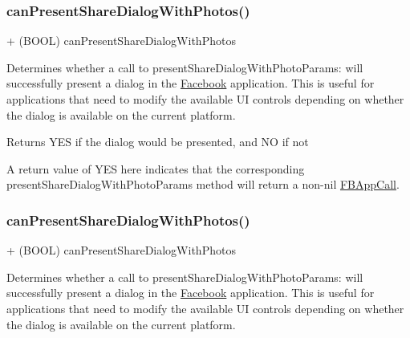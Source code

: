\subsubsection{\texorpdfstring{can\+Present\+Share\+Dialog\+With\+Photos()}{canPresentShareDialogWithPhotos()}\hspace{0.1cm}{\footnotesize\ttfamily [3/5]}}
{\footnotesize\ttfamily + (B\+O\+OL) can\+Present\+Share\+Dialog\+With\+Photos \begin{DoxyParamCaption}{ }\end{DoxyParamCaption}}

Determines whether a call to present\+Share\+Dialog\+With\+Photo\+Params\+: will successfully present a dialog in the \hyperlink{interfaceFacebook}{Facebook} application. This is useful for applications that need to modify the available UI controls depending on whether the dialog is available on the current platform.

\begin{DoxyReturn}{Returns}
Y\+ES if the dialog would be presented, and NO if not
\end{DoxyReturn}
A return value of Y\+ES here indicates that the corresponding present\+Share\+Dialog\+With\+Photo\+Params method will return a non-\/nil \hyperlink{interfaceFBAppCall}{F\+B\+App\+Call}. \mbox{\label{interfaceFBDialogs_a16156d6a4664e4ea55e351bc78b6e8a7}} 
\subsubsection{\texorpdfstring{can\+Present\+Share\+Dialog\+With\+Photos()}{canPresentShareDialogWithPhotos()}\hspace{0.1cm}{\footnotesize\ttfamily [4/5]}}
{\footnotesize\ttfamily + (B\+O\+OL) can\+Present\+Share\+Dialog\+With\+Photos \begin{DoxyParamCaption}{ }\end{DoxyParamCaption}}

Determines whether a call to present\+Share\+Dialog\+With\+Photo\+Params\+: will successfully present a dialog in the \hyperlink{interfaceFacebook}{Facebook} application. This is useful for applications that need to modify the available UI controls depending on whether the dialog is available on the current platform.

